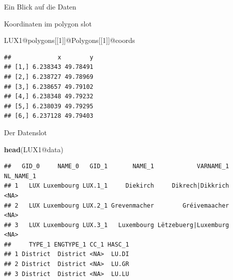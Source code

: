 \documentclass[ignorenonframetext,]{beamer}
\newenvironment{Shaded}{\begin{snugshade}}{\end{snugshade}}
\newcommand{\DecValTok}[1]{\textcolor[rgb]{0.27,0.67,0.26}{#1}}
\newcommand{\KeywordTok}[1]{\textcolor[rgb]{0.26,0.66,0.93}{\textbf{#1}}}
\newcommand{\NormalTok}[1]{\textcolor[rgb]{0.74,0.68,0.62}{#1}}
\newcommand{\OperatorTok}[1]{\textcolor[rgb]{0.74,0.68,0.62}{#1}}
\begin{document}
\begin{frame}[fragile]{Ein Blick auf die Daten}
\protect\hypertarget{ein-blick-auf-die-daten}{}

Koordinaten im polygon slot

\begin{Shaded}
\begin{Highlighting}[]
\NormalTok{LUX1}\OperatorTok{@}\NormalTok{polygons[[}\DecValTok{1}\NormalTok{]]}\OperatorTok{@}\NormalTok{Polygons[[}\DecValTok{1}\NormalTok{]]}\OperatorTok{@}\NormalTok{coords}
\end{Highlighting}
\end{Shaded}

\begin{verbatim}
##             x        y
## [1,] 6.238343 49.78491
## [2,] 6.238727 49.78969
## [3,] 6.238657 49.79102
## [4,] 6.238348 49.79232
## [5,] 6.238039 49.79295
## [6,] 6.237128 49.79403
\end{verbatim}

\end{frame}

\begin{frame}[fragile]{Der Datenslot}
\protect\hypertarget{der-datenslot-1}{}

\begin{Shaded}
\begin{Highlighting}[]
\KeywordTok{head}\NormalTok{(LUX1}\OperatorTok{@}\NormalTok{data)}
\end{Highlighting}
\end{Shaded}

\begin{verbatim}
##   GID_0     NAME_0   GID_1       NAME_1            VARNAME_1 NL_NAME_1
## 1   LUX Luxembourg LUX.1_1     Diekirch     Dikrech|Dikkrich      <NA>
## 2   LUX Luxembourg LUX.2_1 Grevenmacher        Gréivemaacher      <NA>
## 3   LUX Luxembourg LUX.3_1   Luxembourg Lëtzebuerg|Luxemburg      <NA>
##     TYPE_1 ENGTYPE_1 CC_1 HASC_1
## 1 District  District <NA>  LU.DI
## 2 District  District <NA>  LU.GR
## 3 District  District <NA>  LU.LU
\end{verbatim}

\end{frame}
\end{document}
